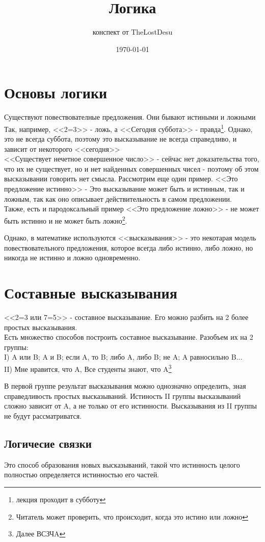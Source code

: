 \documentclass[a4paper,12pt]{article}
\author{конспект от TheLostDesu}
\title{Логика}
\date{\today}
\begin{document}
\maketitle
\section{Основы логики}
Существуют повествователные предложения. Они бывают истиными и ложными\\
Так, например, <<2=3>> - ложь, а <<Сегодня суббота>> - правда\footnote{лекция проходит в субботу}. Однако, это не всегда суббота, поэтому это высказывание не всегда справедливо, и зависит от некоторого <<сегодня>>\\
<<Существует нечетное совершенное число>> - сейчас нет доказательства того, что их не существует, но и нет найденных совершенных чисел - поэтому об этом высказывании говорить нет смысла.
Рассмотрим еще один пример. <<Это предложение истинно>> - Это высказывание может быть и истинным, так и ложным, так как оно описывает действительность в самом предложении.\\
Также, есть и пародоксальный пример <<Это предложение ложно>> - не может быть истинно и не может быть ложно\footnote{Читатель может проверить, что происходит, когда это истино или ложно}. 

Однако, в математике используются <<высказывания>> - это некотарая модель повествовательного предложения, которое всегда либо истинно, либо ложно, но никогда не истинно и ложно одновременно.\\
\section{Составные высказывания}
<<2=3 или 7=5>> - составное высказывание. Его можно разбить на 2 более простых высказывания.\\
Есть множество способов построить составное высказывание. Разобъем их на 2 группы:\\
I) A или B; A и B; если A, то B; либо A, либо B; не A; A равносильно B...\\
II) Мне нравится, что A, Все студенты знают, что A\footnote{Далее ВСЗЧA}

В первой группе результат высказывания можно однозначно определить, зная справедливость простых высказываний. Истиность II группы высказываний сложно зависит от A, а не только от его истинности. Высказывания из II группы не будут рассматриватся.
\subsection{Логичесие связки}
Это способ образования новых высказываний, такой что истинность целого полностью определяется истинностью его частей.\\
\end{document}

